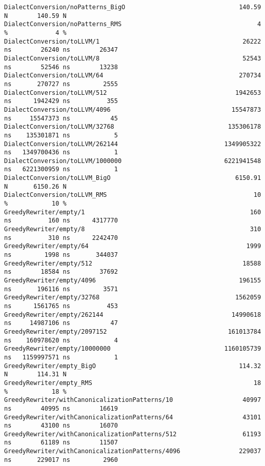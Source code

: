 \begin{code}
\begin{verbatim}
DialectConversion/noPatterns_BigO                               140.59 N        140.59 N
DialectConversion/noPatterns_RMS                                     4 %             4 %
DialectConversion/toLLVM/1                                       26222 ns        26240 ns        26347
DialectConversion/toLLVM/8                                       52543 ns        52546 ns        13238
DialectConversion/toLLVM/64                                     270734 ns       270727 ns         2555
DialectConversion/toLLVM/512                                   1942653 ns      1942429 ns          355
DialectConversion/toLLVM/4096                                 15547873 ns     15547373 ns           45
DialectConversion/toLLVM/32768                               135306178 ns    135301871 ns            5
DialectConversion/toLLVM/262144                             1349905322 ns   1349700436 ns            1
DialectConversion/toLLVM/1000000                            6221941548 ns   6221300959 ns            1
DialectConversion/toLLVM_BigO                                  6150.91 N       6150.26 N
DialectConversion/toLLVM_RMS                                        10 %            10 %
GreedyRewriter/empty/1                                             160 ns          160 ns      4317770
GreedyRewriter/empty/8                                             310 ns          310 ns      2242470
GreedyRewriter/empty/64                                           1999 ns         1998 ns       344037
GreedyRewriter/empty/512                                         18588 ns        18584 ns        37692
GreedyRewriter/empty/4096                                       196155 ns       196116 ns         3571
GreedyRewriter/empty/32768                                     1562059 ns      1561765 ns          453
GreedyRewriter/empty/262144                                   14990618 ns     14987106 ns           47
GreedyRewriter/empty/2097152                                 161013784 ns    160978620 ns            4
GreedyRewriter/empty/10000000                               1160105739 ns   1159997571 ns            1
GreedyRewriter/empty_BigO                                       114.32 N        114.31 N
GreedyRewriter/empty_RMS                                            18 %            18 %
GreedyRewriter/withCanonicalizationPatterns/10                   40997 ns        40995 ns        16619
GreedyRewriter/withCanonicalizationPatterns/64                   43101 ns        43100 ns        16070
GreedyRewriter/withCanonicalizationPatterns/512                  61193 ns        61189 ns        11507
GreedyRewriter/withCanonicalizationPatterns/4096                229037 ns       229017 ns         2960

\end{verbatim}
\end{code}
